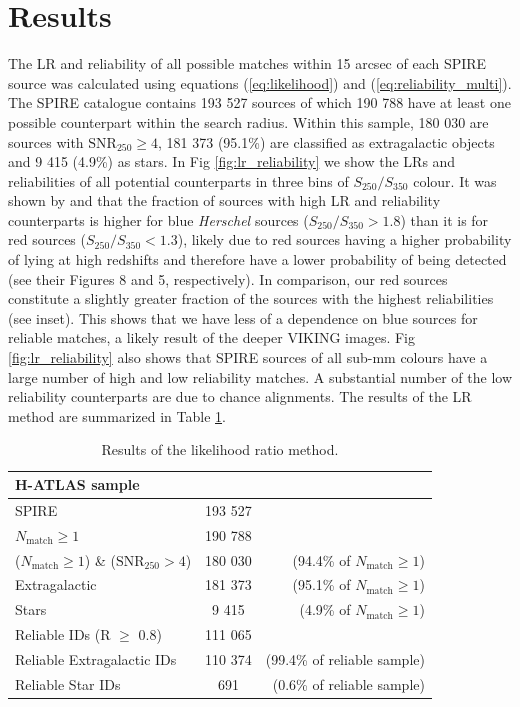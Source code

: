 \documentclass[fleqn,usenatbib]{mnras}
\begin{document}
\section{Results}
\label{sec:results}

The LR and reliability of all possible matches within 15 arcsec of each SPIRE source was calculated using equations (\ref{eq:likelihood}) and (\ref{eq:reliability_multi}). The SPIRE catalogue contains 193 527 sources of which 190 788 have at least one possible counterpart within the search radius. Within this sample, 180 030 are sources with $\textrm{SNR}_{250} \geq 4$, 181 373 (95.1\%) are classified as extragalactic objects and 9 415 (4.9\%) as stars. In Fig \ref{fig:lr_reliability} we show the LRs and reliabilities of all potential counterparts in three bins of $S_{250}/S_{350}$ colour. It was shown by \citealt{Bourne_2016} and \citealt{Furlanetto_2018} that the fraction of sources with high LR and reliability counterparts is higher for blue \textit{Herschel} sources ($S_{250}/S_{350} > 1.8$) than it is for red sources ($S_{250}/S_{350} < 1.3$), likely due to red sources having a higher probability of lying at high redshifts and therefore have a lower probability of being detected (see their Figures 8 and 5, respectively). In comparison, our red sources constitute a slightly greater fraction of the sources with the highest reliabilities (see inset). This shows that we have less of a dependence on blue sources for reliable matches, a likely result of the deeper VIKING images. Fig \ref{fig:lr_reliability} also shows that SPIRE sources of all sub-mm colours have a large number of high and low reliability matches. A substantial number of the low reliability counterparts are due to chance alignments. The results of the LR method are summarized in Table \ref{tab:lr_results}. 

\begin{table}
	\centering
	\caption{Results of the likelihood ratio method.}
	\label{tab:lr_results}
	\begin{tabular}{lcr}
		\hline
		\hline
		H-ATLAS sample &  & \\
		\hline
		SPIRE & 193 527 & \\
		$N_{\textrm{match}} \geq 1$ & 190 788 & \\
		($N_{\textrm{match}} \geq 1$) \& ($\textrm{SNR}_{250} > 4$) & 180 030 & (94.4\% of $N_{\textrm{match}} \geq 1$)\\
		Extragalactic & 181 373 & (95.1\% of $N_{\textrm{match}} \geq 1$)\\
		Stars & 9 415 & (4.9\% of $N_{\textrm{match}} \geq 1$) \\
		Reliable IDs (R $\geq$ 0.8) & 111 065 & \\
		Reliable Extragalactic IDs & 110 374 & (99.4\% of reliable sample) \\
		Reliable Star IDs & 691 & (0.6\% of reliable sample) \\
		\hline
		\hline
	\end{tabular}
\end{table}
\end{document}
